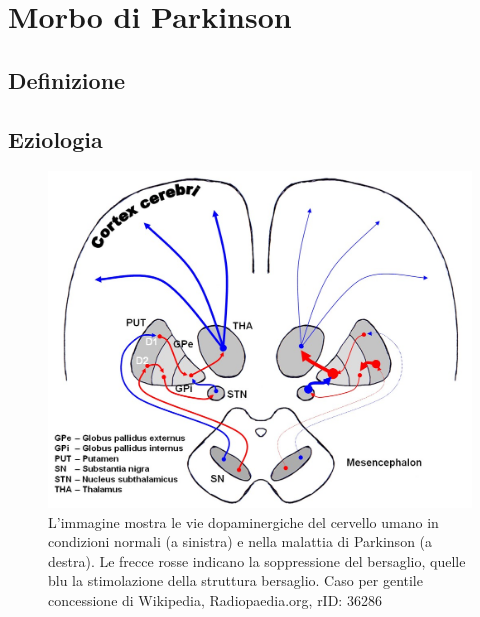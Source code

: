 \section{Morbo di Parkinson}

\subsection{Definizione}

\subsection{Eziologia}

\begin{figure}[h]
	\centering
	\includegraphics[width=0.5\linewidth]{FileAusiliari/Immagini/degenerative/dopamine-in-parkinsons-disease-illustration}
	\caption[Vie dopaminergiche]{L'immagine mostra le vie dopaminergiche del cervello umano in condizioni normali (a sinistra) e nella malattia di Parkinson (a destra). Le frecce rosse indicano la soppressione del bersaglio, quelle blu la stimolazione della struttura bersaglio. Caso per gentile concessione di Wikipedia, Radiopaedia.org, rID: 36286}
	\label{fig:dopamine-in-parkinsons-disease-illustration}
\end{figure}

